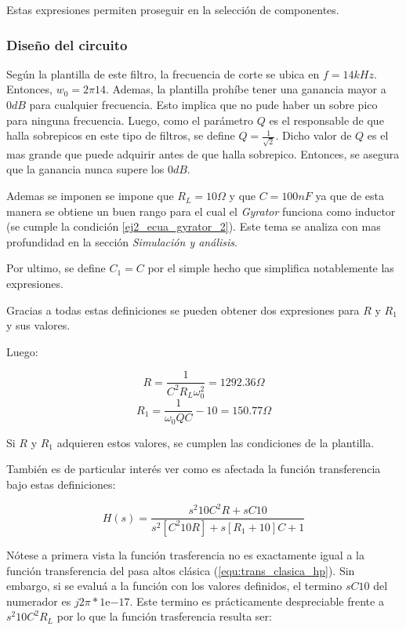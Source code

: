 \documentclass[12pt,a4paper]{article}
\begin{document}
Estas expresiones permiten proseguir en la selección de componentes. 


\subsubsection{Diseño del circuito}

Según la plantilla de este filtro, la frecuencia de corte se ubica en $f = 14kHz$. Entonces, $w_0 = 2\pi 14$. Ademas, la plantilla prohíbe tener una ganancia mayor a $0 dB$ para cualquier frecuencia. Esto implica que no pude haber un sobre pico para ninguna frecuencia. Luego, como el parámetro $Q$ es el responsable de que halla sobrepicos en este tipo de filtros, se define  $Q=\frac{1}{\sqrt{2}}$. Dicho valor de $Q$ es el mas grande que puede adquirir antes de que halla sobrepico. Entonces, se asegura que la ganancia nunca supere los $0dB$.  


Ademas se imponen se impone que $R_L = 10 \Omega$ y que $ C = 100nF$ ya que de esta manera se obtiene un buen rango para el cual el \textit{Gyrator} funciona como inductor (se cumple la condición \ref{ej2_ecua_gyrator_2}). Este tema se analiza con mas profundidad en la sección \textit{Simulación y análisis}.

Por ultimo, se define $C_1 = C$ por el simple hecho que simplifica notablemente las expresiones. 

Gracias a todas estas definiciones se pueden obtener dos expresiones para $R$ y $R_1$ y sus valores.  

Luego:

\begin{displaymath} R = \frac{1}{C^2 R_L \omega_0^2} = 1292.36 \Omega \end{displaymath}  
\begin{displaymath} R_1 = \frac{1}{\omega_0 Q C} - 10 = 150.77 \Omega \end{displaymath}  

Si $R$ y $R_1$ adquieren estos valores, se cumplen las condiciones de la plantilla. 

También es de particular interés ver como es afectada la función transferencia bajo estas definiciones:

\begin{displaymath} H(s)= \frac{s^2 10 C ^2 R + sC10}{s^2[C^2 10 R] + s[R_1 + 10]C + 1} \end{displaymath}

Nótese a primera vista la función trasferencia no es exactamente igual a la función transferencia del pasa altos clásica (\ref{equ:trans_clasica_hp}). Sin embargo, si se evaluá a la función con los valores definidos, el termino $sC10$ del numerador es $j2\pi * 1\mathrm{e}{-17}$. Este termino es prácticamente despreciable frente a $s^2 10 C^2 R_L$  por lo que la función trasferencia resulta ser:
\end{document}
